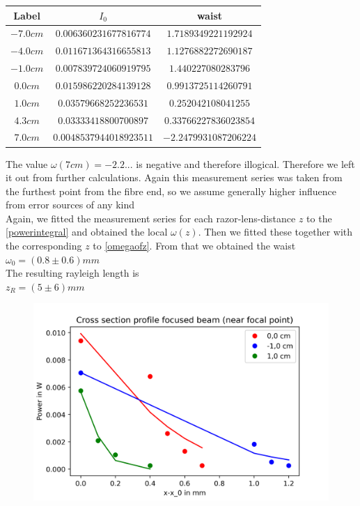 \documentclass{article}
\begin{document}
\begin{tabular}{ccc} 
  \hline
  Label & $I_{0}$ & waist \\ 
  \hline
  $-7.0 cm$ &$ 0.006360231677816774$ &$ 1.7189349221192924 $\\ 
  \hline
  $-4.0 cm$ &$ 0.011671364316655813$ &$ 1.1276882272690187 $\\ 
  \hline
  $-1.0cm$ &$ 0.007839724060919795$ &$ 1.440227080283796 $\\
  \hline
  $0.0 cm$ &$ 0.015986220284139128$ &$ 0.9913725114260791 $\\ 
  \hline
  $1.0 cm$ &$ 0.03579668252236531$ &$ 0.252042108041255 $ \\
  \hline
  $4.3 cm$ &$ 0.03333418800700897$ & $ 0.33766227836023854$ \\ 
  \hline
  $7.0 cm$ & $0.0048537944018923511$ & $-2.2479931087206224$\\
  \hline 
\end{tabular}

The value $\omega(7cm) = -2.2... $ is negative and therefore illogical. Therefore we left it out from further calculations. Again this measurement series was taken from the furthest point from the fibre end, so we assume generally higher influence from error sources of any kind\\

Again, we fitted the measurement series for each razor-lens-distance $z$ to the \ref{powerintegral} and obtained the local $\omega(z)$. Then we fitted these together with the corresponding $z$ to \ref{omegaofz}.
From that we obtained the waist\\ 
$\omega_{0} = ( 0.8 \pm 0.6 ) mm $\\
The resulting rayleigh length is\\
$z_{R} =  ( 5 \pm 6 ) mm $\\

\begin{figure}[h!]
\includegraphics[width=\textwidth]{Cross section profile focused beam (near focal point).png} 
\label{near_focal} 
\end{figure}
\end{document}
